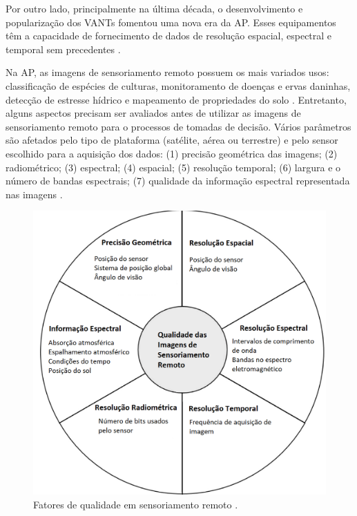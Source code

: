 \documentclass[12pt]{article}
\begin{document}
Por outro lado, principalmente na última década, o desenvolvimento e popularização dos VANTs fomentou uma nova era da AP. Esses equipamentos têm a capacidade de fornecimento de dados de resolução espacial, espectral e temporal sem precedentes \cite{maes2019perspectives, dyrmann2016plant}.

Na AP, as imagens de sensoriamento remoto possuem os mais variados usos: classificação de espécies de culturas, monitoramento de doenças e ervas daninhas, detecção de estresse hídrico e mapeamento de propriedades do solo \cite{ihuoma2017recent}. Entretanto, alguns aspectos precisam ser avaliados antes de utilizar as imagens de sensoriamento remoto para o processos de tomadas de decisão. Vários parâmetros são afetados pelo tipo de plataforma (satélite, aérea ou terrestre) e pelo sensor escolhido para a aquisição dos dados: (1) precisão geométrica das imagens; (2) radiométrico; (3) espectral; (4) espacial; (5) resolução temporal; (6) largura e o número de bandas espectrais; (7) qualidade da informação espectral representada nas imagens \cite{khanal2017overview}. 

\begin{figure}[!htpb]
    \centering
    \includegraphics[width=0.5\textheight]{figures/qualidade_imagens.png}
    \caption{Fatores de qualidade em sensoriamento remoto \cite{khanal2017overview}.}
    \label{fig:qualidade_imagens}
\end{figure}
\end{document}
